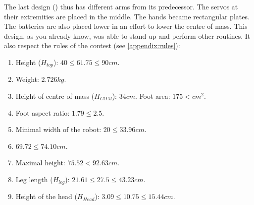 The last design () thus has different arms from its predecessor. The servos at their extremities are placed in the middle. The hands became rectangular plates. The batteries are also placed lower in an effort to lower the centre of mass. This design, as you already know, was able to stand up and perform other routines. It also respect the rules of the contest (see \cref{appendix:rules}):
\begin{enumerate}
	\item Height ($H_{top}$):  $40 \leq 61.75 \leq 90cm$.
	\item Weight: $2.726kg$.
	\item Height of centre of mass ($H_{COM}$): $34cm$. Foot area: $175 < cm^2$.
	\item Foot aspect ratio: $1.79 \leq 2.5$.
	\item Minimal width of the robot: $20 \leq 33.96cm$.
	\item $69.72 \leq 74.10cm$.
	\item Maximal height: $75.52 < 92.63cm$.
	\item Leg length ($H_{leg}$): $21.61 \leq 27.5 \leq 43.23cm$.
	\item Height of the head ($H_{Head}$): $3.09 \leq 10.75 \leq 15.44cm$.
\end{enumerate}

